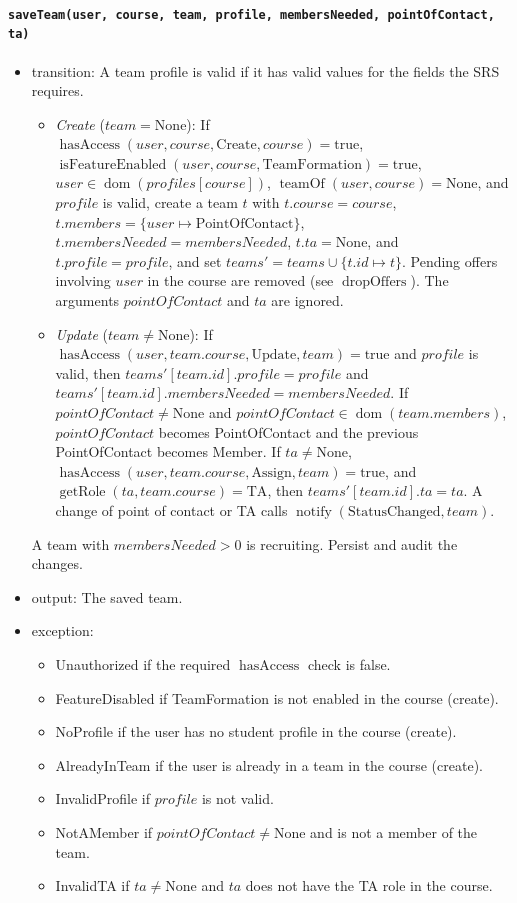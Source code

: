 \documentclass[12pt, titlepage]{article}
\begin{document}
\paragraph{\texttt{saveTeam(user, course, team, profile, membersNeeded, pointOfContact, ta)}}
\begin{itemize}
    \item transition: A team profile is valid if it has valid values for the fields the SRS requires.
    \begin{itemize}
        \item \emph{Create} ($team=\text{None}$): If $\operatorname{hasAccess}(user,course,\text{Create},course)=\text{true}$, $\operatorname{isFeatureEnabled}(user,course,\text{TeamFormation})=\text{true}$, $user\in\operatorname{dom}(\mathit{profiles}[course])$, $\operatorname{teamOf}(user,course)=\text{None}$, and $profile$ is valid, create a team $t$ with $t.course=course$, $t.members=\{user\mapsto\text{PointOfContact}\}$, $t.membersNeeded=membersNeeded$, $t.ta=\text{None}$, and $t.profile=profile$, and set $\mathit{teams}'=\mathit{teams}\cup\{t.id\mapsto t\}$. Pending offers involving $user$ in the course are removed (see $\operatorname{dropOffers}$). The arguments $pointOfContact$ and $ta$ are ignored.
        \item \emph{Update} ($team\ne\text{None}$): If $\operatorname{hasAccess}(user,team.course,\text{Update},team)=\text{true}$ and $profile$ is valid, then $\mathit{teams}'[team.id].profile=profile$ and $\mathit{teams}'[team.id].membersNeeded=membersNeeded$. If $pointOfContact\ne\text{None}$ and $pointOfContact\in\operatorname{dom}(team.members)$, $pointOfContact$ becomes PointOfContact and the previous PointOfContact becomes Member. If $ta\ne\text{None}$, $\operatorname{hasAccess}(user,team.course,\text{Assign},team)=\text{true}$, and $\operatorname{getRole}(ta,team.course)=\text{TA}$, then $\mathit{teams}'[team.id].ta=ta$. A change of point of contact or TA calls $\operatorname{notify}(\text{StatusChanged},team)$.
    \end{itemize}
    A team with $membersNeeded>0$ is recruiting. Persist and audit the changes.
    \item output: The saved team.
    \item exception:
    \begin{itemize}
        \item Unauthorized if the required $\operatorname{hasAccess}$ check is false.
        \item FeatureDisabled if TeamFormation is not enabled in the course (create).
        \item NoProfile if the user has no student profile in the course (create).
        \item AlreadyInTeam if the user is already in a team in the course (create).
        \item InvalidProfile if $profile$ is not valid.
        \item NotAMember if $pointOfContact\ne\text{None}$ and is not a member of the team.
        \item InvalidTA if $ta\ne\text{None}$ and $ta$ does not have the TA role in the course.
    \end{itemize}
\end{itemize}
\end{document}
